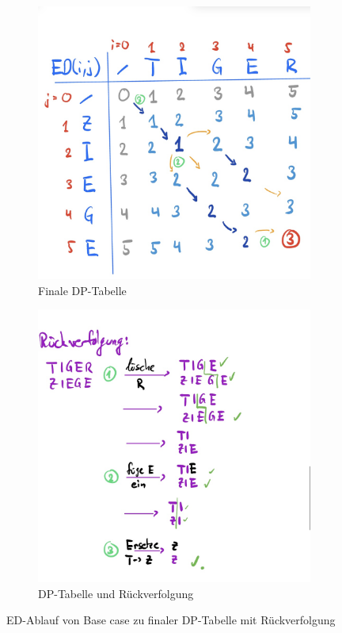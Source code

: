 \documentclass[a4paper]{article}
\begin{document}
\begin{figure}[h]
\begin{subfigure}{0.45\textwidth}
 \includegraphics[width=\textwidth]{Pictures/ED2.jpg}
        \caption{Finale DP-Tabelle}
        \label{fig:ED02}
\end{subfigure}
\begin{subfigure}{0.45\textwidth}
 \includegraphics[width=\textwidth]{Pictures/ED3.jpg}
        \caption{DP-Tabelle und Rückverfolgung}
        \label{fig:ED03}
\end{subfigure}
\caption{ED-Ablauf von Base case zu finaler DP-Tabelle mit Rückverfolgung}
\label{fig:ED-Ablauf}
\end{figure}
\end{document}
